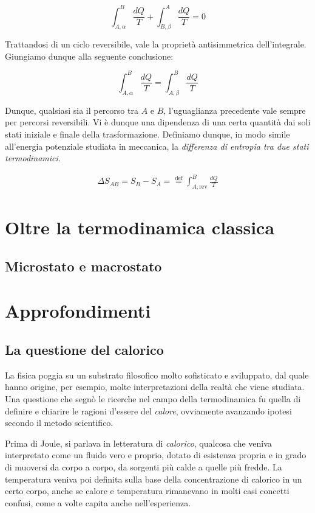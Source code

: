 \[ \int_{A,\alpha}^{B} \frac{dQ}{T} + \int_{B,\beta}^{A} \frac{dQ}{T} = 0 \]

\noindent Trattandosi di un ciclo reversibile, vale la proprietà antisimmetrica
dell'integrale. Giungiamo dunque alla seguente conclusione:

\[ \int_{A,\alpha}^{B} \frac{dQ}{T} = \int_{A,\beta}^{B} \frac{dQ}{T} \]

\noindent Dunque, qualsiasi sia il percorso tra $A$ e $B$, l'uguaglianza
precedente vale sempre per percorsi reversibili. Vi è dunque una dipendenza
di una certa quantità dai soli stati iniziale e finale della trasformazione.
Definiamo dunque, in modo simile all'energia potenziale studiata in meccanica,
la \textit{differenza di entropia tra due stati termodinamici}.

\begin{align}
    \Delta S_{AB} = S_B - S_A = \stackrel{\text{def}}{=} \int_{A,\text{rev}}^{B} \frac{dQ}{T}
\end{align}


\section{Oltre la termodinamica classica}

\subsection{Microstato e macrostato}









\section{Approfondimenti}

\subsection{La questione del calorico}
La fisica poggia su un substrato filosofico molto sofisticato e
sviluppato, dal quale hanno origine, per esempio, molte interpretazioni
della realtà che viene studiata. Una questione che segnò le ricerche
nel campo della termodinamica fu quella di definire e chiarire le
ragioni d'essere del \textit{calore}, ovviamente avanzando ipotesi
secondo il metodo scientifico.

Prima di Joule, si parlava in letteratura di \textit{calorico},
qualcosa che veniva interpretato come un fluido vero e proprio,
dotato di esistenza propria e in grado di muoversi da corpo a
corpo, da sorgenti più calde a quelle più fredde. La temperatura
veniva poi definita sulla base della concentrazione di calorico
in un certo corpo, anche se calore e temperatura rimanevano in
molti casi concetti confusi, come a volte capita anche nell'esperienza.

